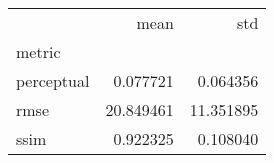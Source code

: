 \begin{tabular}{lrr}
\toprule
{} &       mean &        std \\
metric     &            &            \\
\midrule
perceptual &   0.077721 &   0.064356 \\
rmse       &  20.849461 &  11.351895 \\
ssim       &   0.922325 &   0.108040 \\
\bottomrule
\end{tabular}
